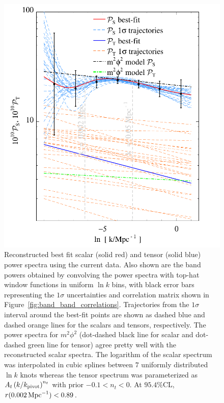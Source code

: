 \documentclass[a4paper,11pt]{article}
\def\mpc{{\rm\,Mpc}}
\def\mpc{{\rm\,Mpc}}
\begin{document}
\begin{figure}
  \includegraphics[width=0.9\linewidth]{p7cubicspline_traj11} 
  \caption{Reconstructed best fit scalar (solid red) and tensor (solid
  blue) power spectra using the current data. Also shown are the band
  powers obtained by convolving the power spectra with top-hat window
  functions in uniform $\ln k$ bins, with black error bars
  representing the $1\sigma$ uncertainties and correlation matrix
  shown in Figure~\ref{fig:band_band_correlations}. Trajectories from
  the $1\sigma$ interval around the best-fit points are shown as
  dashed blue and dashed orange lines for the scalars and tensors,
  respectively. The power spectra for $m^2\phi^2$ (dot-dashed black
  line for scalar and dot-dashed green line for tensor) agree pretty
  well with the reconstructed scalar spectra. The logarithm of the
  scalar spectrum was interpolated in cubic splines between $7$
  uniformly distributed $\ln k$ knots whereas the tensor spectrum was
  parameterized as $A_t \left(k/k_{\rm pivot}\right)^{n_t}$ with prior
  $-0.1<n_t<0$. At $95.4\%$CL, $r(0.002\mpc^{-1})
  <0.89$.}
  \label{fig:7knot_Ps_Pt}
\end{figure}
\end{document}
